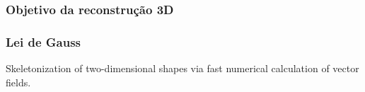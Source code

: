 \begin{frame}
  \frametitle{Objetivo da reconstrução 3D}
  \frametitle{Lei de Gauss}

\begin{alertblock}{\cite{homem2004skeletonization}}
  Skeletonization of two-dimensional shapes via fast numerical calculation of
  vector fields.
\end{alertblock}
\end{frame}


